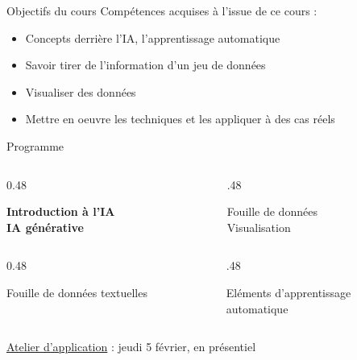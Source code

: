
\begin{frame}{Objectifs du cours}
  Compétences acquises à l'issue de ce cours :
  \begin{itemize}
    \item Concepts derrière l'IA, l'apprentissage automatique
    \item Savoir tirer de l'information d'un jeu de données
    \item Visualiser des données
    \item Mettre en oeuvre les techniques et les appliquer à des cas réels
  \end{itemize}
\end{frame}



\begin{frame}{Programme}

  \begin{columns}
    \begin{column}{0.48\textwidth}
      \begin{tcolorbox}[title=\textsc{\textcolor{black}{Session 1 -- 8 janvier}}, colframe=gray!40]
        \footnotesize{\textbf{Introduction à l'IA\\IA générative}}
      \end{tcolorbox}
    \end{column}

    \begin{column}{.48\textwidth}
      \begin{tcolorbox}[title=\textsc{\textcolor{black}{Session 2 -- 15 janvier}}, colframe=gray!40]
        \footnotesize{Fouille de données \\Visualisation}
      \end{tcolorbox}
    \end{column}
  \end{columns}

  \begin{columns}
    \begin{column}{0.48\textwidth}
      \begin{tcolorbox}[title=\textsc{\textcolor{black}{Session 3 -- 26 janvier}}, colframe=gray!40]
        \footnotesize{Fouille de données textuelles\\}
      \end{tcolorbox}
    \end{column}
    \begin{column}{.48\textwidth}
      \begin{tcolorbox}[title=\textsc{\textcolor{black}{Session 4 -- 29 janvier}}, colframe=gray!40]
        \footnotesize{Eléments d'apprentissage\\automatique}
      \end{tcolorbox}
    \end{column}

  \end{columns}
  
  \bigskip

  \underline{Atelier d'application} : jeudi 5 février, en présentiel

\end{frame}



